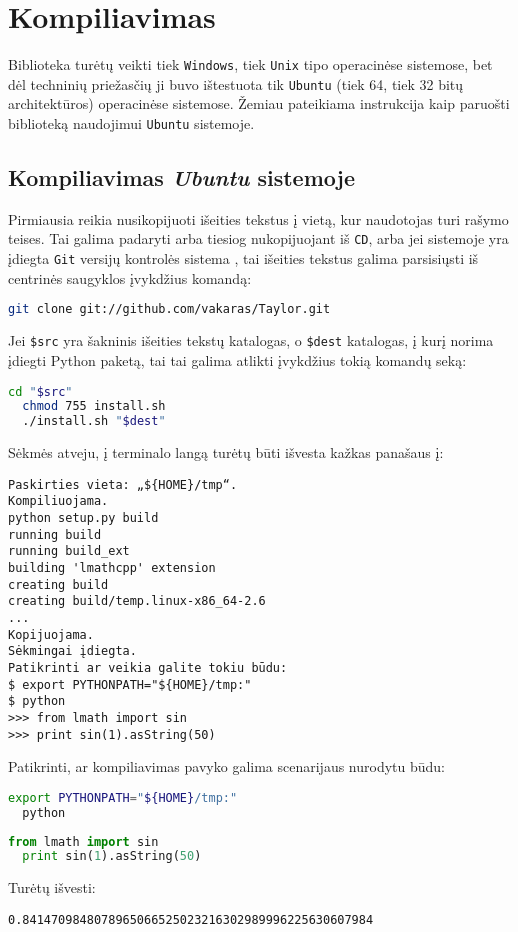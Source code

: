 \chapter{Kompiliavimas}

Biblioteka turėtų veikti tiek \verb|Windows|, tiek 
\verb|Unix| tipo operacinėse sistemose, bet dėl techninių priežasčių
ji buvo ištestuota tik \verb|Ubuntu| (tiek 64, tiek 32 bitų 
architektūros) operacinėse sistemose. Žemiau pateikiama instrukcija
kaip paruošti biblioteką naudojimui \verb|Ubuntu| sistemoje.

\section{Kompiliavimas \emph{Ubuntu} sistemoje}

Pirmiausia reikia nusikopijuoti išeities tekstus į vietą, kur naudotojas
turi rašymo teises. Tai galima padaryti arba tiesiog nukopijuojant
iš \verb|CD|, arba jei sistemoje yra įdiegta \verb|Git| versijų kontrolės
sistema \cite{git}, tai išeities tekstus galima parsisiųsti iš centrinės
saugyklos įvykdžius komandą:

\begin{lstlisting}[language=bash]
  git clone git://github.com/vakaras/Taylor.git  
\end{lstlisting}

Jei \verb|$src| yra šakninis išeities tekstų katalogas, o \verb|$dest|
katalogas, į kurį norima įdiegti Python paketą, tai tai galima 
atlikti įvykdžius tokią komandų seką:

\begin{lstlisting}[language=bash]
  cd "$src"
  chmod 755 install.sh
  ./install.sh "$dest"
\end{lstlisting}

Sėkmės atveju, į terminalo langą turėtų būti išvesta kažkas panašaus į:
\begin{verbatim}
Paskirties vieta: „${HOME}/tmp“.
Kompiliuojama.
python setup.py build
running build
running build_ext
building 'lmathcpp' extension
creating build
creating build/temp.linux-x86_64-2.6
...
Kopijuojama.
Sėkmingai įdiegta.
Patikrinti ar veikia galite tokiu būdu:
$ export PYTHONPATH="${HOME}/tmp:"
$ python
>>> from lmath import sin
>>> print sin(1).asString(50)
\end{verbatim}

Patikrinti, ar kompiliavimas pavyko galima scenarijaus nurodytu būdu:
\begin{lstlisting}[language=bash]
  export PYTHONPATH="${HOME}/tmp:"
  python
\end{lstlisting}
\begin{lstlisting}[language=python]
  from lmath import sin
  print sin(1).asString(50)
\end{lstlisting}
Turėtų išvesti:
\begin{verbatim}
0.8414709848078965066525023216302989996225630607984
\end{verbatim}

